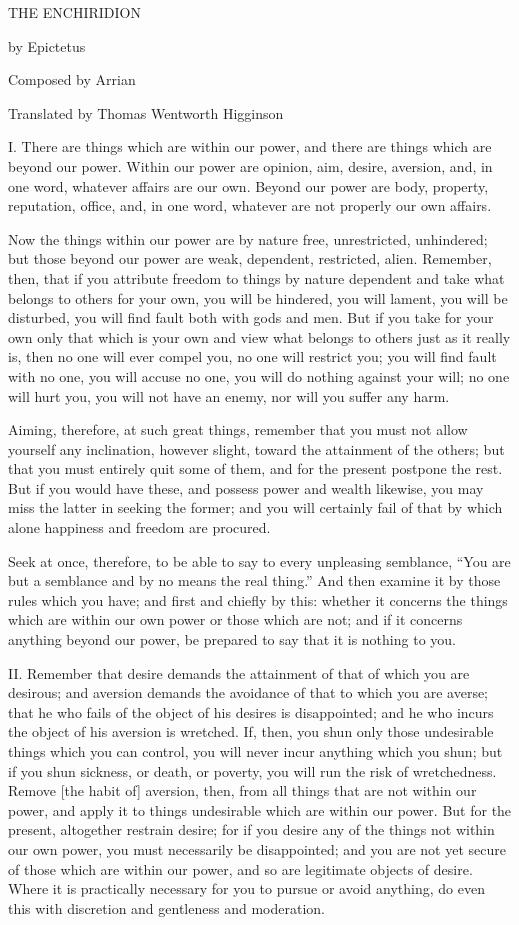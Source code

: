 \documentclass[a4paper]{article}
\begin{document}
THE ENCHIRIDION

by Epictetus

Composed by Arrian

Translated by Thomas Wentworth Higginson

I. There are things which are within our power, and there are things which
are beyond our power. Within our power are opinion, aim, desire,
aversion, and, in one word, whatever affairs are our own. Beyond our
power are body, property, reputation, office, and, in one word, whatever
are not properly our own affairs.

Now the things within our power are by nature free, unrestricted,
unhindered; but those beyond our power are weak, dependent, restricted,
alien. Remember, then, that if you attribute freedom to things by nature
dependent and take what belongs to others for your own, you will be
hindered, you will lament, you will be disturbed, you will find fault
both with gods and men. But if you take for your own only that which is
your own and view what belongs to others just as it really is, then no
one will ever compel you, no one will restrict you; you will find fault
with no one, you will accuse no one, you will do nothing against your
will; no one will hurt you, you will not have an enemy, nor will you
suffer any harm.

Aiming, therefore, at such great things, remember that you must not allow
yourself any inclination, however slight, toward the attainment of the
others; but that you must entirely quit some of them, and for the present
postpone the rest. But if you would have these, and possess power and
wealth likewise, you may miss the latter in seeking the former; and you
will certainly fail of that by which alone happiness and freedom are
procured.

Seek at once, therefore, to be able to say to every unpleasing semblance,
“You are but a semblance and by no means the real thing.” And then
examine it by those rules which you have; and first and chiefly by this:
whether it concerns the things which are within our own power or those
which are not; and if it concerns anything beyond our power, be prepared
to say that it is nothing to you.

II. Remember that desire demands the attainment of that of which you are
desirous; and aversion demands the avoidance of that to which you are
averse; that he who fails of the object of his desires is disappointed;
and he who incurs the object of his aversion is wretched. If, then, you
shun only those undesirable things which you can control, you will never
incur anything which you shun; but if you shun sickness, or death, or
poverty, you will run the risk of wretchedness. Remove [the habit of]
aversion, then, from all things that are not within our power, and apply
it to things undesirable which are within our power. But for the present,
altogether restrain desire; for if you desire any of the things not
within our own power, you must necessarily be disappointed; and you are
not yet secure of those which are within our power, and so are legitimate
objects of desire. Where it is practically necessary for you to pursue or
avoid anything, do even this with discretion and gentleness and
moderation.
\end{document}
